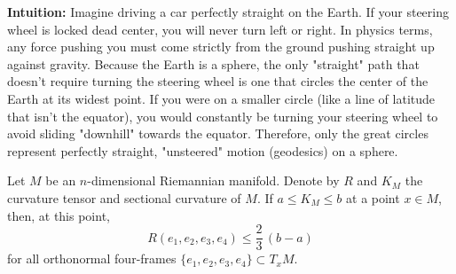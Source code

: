 \begin{solution}
\textbf{Intuition:}
Imagine driving a car perfectly straight on the Earth. If your steering wheel is locked dead center, you will never turn left or right. In physics terms, any force pushing you must come strictly from the ground pushing straight up against gravity. Because the Earth is a sphere, the only "straight" path that doesn't require turning the steering wheel is one that circles the center of the Earth at its widest point. If you were on a smaller circle (like a line of latitude that isn't the equator), you would constantly be turning your steering wheel to avoid sliding "downhill" towards the equator. Therefore, only the great circles represent perfectly straight, "unsteered" motion (geodesics) on a sphere.
\end{solution}

\begin{exercise}
\label{geometry:2016:11}
Let $M$ be an $n$-dimensional Riemannian manifold. Denote by $R$ and $K_{M}$ the curvature tensor and sectional curvature of $M$. If $a \leq K_{M} \leq b$ at a point $x \in M$, then, at this point,
\[ R(e_{1}, e_{2}, e_{3}, e_{4}) \leq \frac{2}{3}\,(b - a) \]
for all orthonormal four-frames $\{e_{1}, e_{2}, e_{3}, e_{4}\} \subset T_{x}M$.
\end{exercise}

